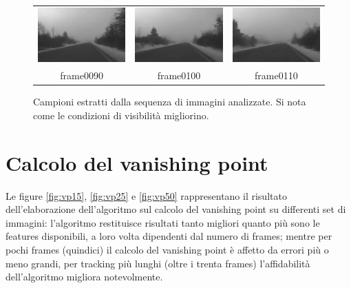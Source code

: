 \documentclass[12pt]{report}
\begin{document}
\begin{figure}[H]
\begin{tabular}{ccc}
	\includegraphics[scale=\videoScale]{images/frame0090.jpg} & \includegraphics[scale=\videoScale]{images/frame0100.jpg} & \includegraphics[scale=\videoScale]{images/frame0110.jpg}\\
	frame0090 & frame0100 & frame0110 \\
\end{tabular}
\caption{Campioni estratti dalla sequenza di immagini analizzate. Si nota come le condizioni di visibilit\`a migliorino.}
\label{fig:video}
\end{figure}

\section{Calcolo del vanishing point}

\noindent Le figure \ref{fig:vp15}, \ref{fig:vp25} e \ref{fig:vp50} rappresentano il risultato dell'elaborazione dell'algoritmo sul calcolo del vanishing point su differenti set di immagini: l'algoritmo restituisce risultati tanto migliori quanto pi\`u sono le features disponibili, a loro volta dipendenti dal numero di frames; mentre per pochi frames (quindici) il calcolo del vanishing point \`e affetto da errori pi\`u o meno grandi, per tracking pi\`u lunghi (oltre i trenta frames) l'affidabilit\`a dell'algoritmo migliora notevolmente.\\
\end{document}
